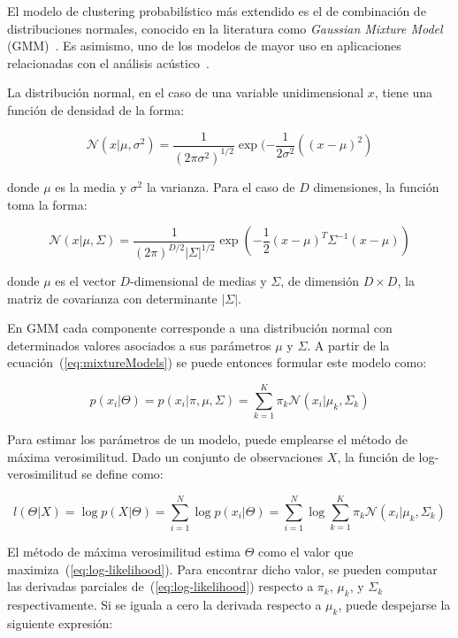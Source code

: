 El modelo de clustering probabilístico más extendido es el de combinación de distribuciones normales, conocido en la literatura como \textit{Gaussian Mixture Model} (GMM)~\cite{Murphy12}.
Es asimismo, uno de los modelos de mayor uso en aplicaciones relacionadas con el análisis acústico~\cite{Kakar13,Kwan06,Lee08,Somervuo06,Virtanen18}.

La distribución normal, en el caso de una variable unidimensional $x$, tiene una función de densidad de la forma:

\begin{equation}
    \label{eq:singleGaussian}
    \mathcal{N}(x|\mu,\sigma^2)=\frac{1}{(2\pi\sigma^2)^{1/2}}\exp{(-\frac{1}{2\sigma^2}((x-\mu)^2)}
\end{equation}

\noindent
donde $\mu$ es la media y $\sigma^2$ la varianza.
Para el caso de $D$ dimensiones, la función toma la forma:

\begin{equation}
    \label{eq:multidimGaussian}
    \mathcal{N}(x|\mu,\Sigma)=\frac{1}{(2\pi)^{D/2}|\Sigma|^{1/2}}\exp{(-\frac{1}{2}(x-\mu)^T \Sigma^{-1}(x-\mu))}
\end{equation}

\noindent
donde $\mu$ es el vector $D$-dimensional de medias y $\Sigma$, de dimensión $D\times D$, la matriz de covarianza con determinante $|\Sigma|$.

En GMM cada componente corresponde a una distribución normal con determinados valores asociados a sus parámetros $\mu$ y $\Sigma$.
A partir de la ecuación~(\ref{eq:mixtureModels}) se puede entonces formular este modelo como:

\begin{equation}
    \label{eq:GMM}
    p(x_i|\Theta) = p(x_i|\pi,\mu,\Sigma)= \sum_{k=1}^{K}{\pi_k \mathcal{N}(x_i|\mu_k,\Sigma_k)}
\end{equation}

Para estimar los parámetros de un modelo, puede emplearse el método de máxima verosimilitud.
Dado un conjunto de observaciones $X$, la función de log-verosimilitud se define como:

\begin{equation}
    \label{eq:log-likelihood}
    l(\Theta|X) = \log{p(X|\Theta)} = \sum_{i=1}^{N}{\log{p(x_i|\Theta)}} = \sum_{i=1}^{N}{\log{\sum_{k=1}^{K}{\pi_k \mathcal{N}(x_i|\mu_k,\Sigma_k)}}}
\end{equation}

El método de máxima verosimilitud estima $\Theta$ como el valor que maximiza~(\ref{eq:log-likelihood}).
Para encontrar dicho valor, se pueden computar las derivadas parciales de~(\ref{eq:log-likelihood}) respecto a $\pi_k$, $\mu_k$, y $\Sigma_k$ respectivamente.
Si se iguala a cero la derivada respecto a $\mu_k$, puede despejarse la siguiente expresión:


